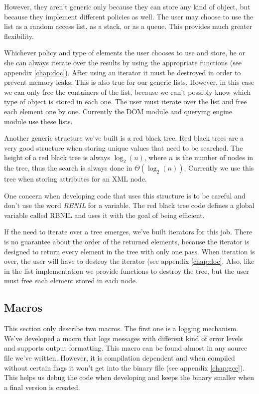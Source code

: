 \documentclass[a4paper]{report}
\begin{document}
		However, they aren't generic only because they can store any kind of object, but because they implement different policies as well. The user may choose to use the list as a random access list, as a stack, or as a queue. This provides much greater flexibility.

		Whichever policy and type of elements the user chooses to use and store, he or she can always iterate over the results by using the appropriate functions (see appendix \ref{chap:doc}). After using an iterator it must be destroyed in order to prevent memory leaks. This is also true for our generic lists. However, in this case we can only free the containers of the list, because we can't possibly know which type of object is stored in each one. The user must iterate over the list and free each element one by one. Currently the DOM module and querying engine module use these lists.

		Another generic structure we've built is a red black tree. Red black trees are a very good structure when storing unique values that need to be searched. The height of a red black tree is always $\log_2(n)$, where $n$ is the number of nodes in the tree, thus the search is always done in $\Theta(\log_2(n))$. Currently we use this tree when storing attributes for an XML node.

		One concern when developing code that uses this structure is to be careful and don't use the word \emph{RBNIL} for a variable. The red black tree code defines a global variable called RBNIL and uses it with the goal of being efficient.

		If the need to iterate over a tree emerges, we've built iterators for this job. There is no guarantee about the order of the returned elements, because the iterator is designed to return every element in the tree with only one pass. When iteration is over, the user will have to destroy the iterator (see appendix \ref{chap:doc}. Also, like in the list implementation we provide functions to destroy the tree, but the user must free each element stored in each node.

	\subsection{Macros}
		This section only describe two macros. The first one is a logging mechanism. We've developed a macro that logs messages with different kind of error levels and supports output formatting. This macro can be found	almost in any source file we've written. However, it is compilation dependent and when compiled without certain flags it won't get into the binary file (see appendix \ref{chap:gcc}). This helps us debug the code when developing and keeps the binary smaller when a final version is created.
\end{document}
